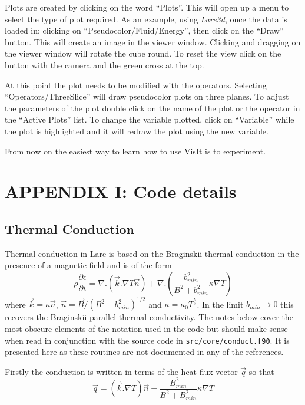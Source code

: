 \documentclass[11pt]{article}
\begin{document}
Plots are created by clicking on the word ``Plots''. This will open up a menu to select the type of plot required. As an example, using {\it Lare3d}, once the data is loaded in: clicking on ``Pseudocolor/Fluid/Energy'', then click on the ``Draw'' button. This will create an image in the viewer window. Clicking and dragging on the viewer window will rotate the cube round. To reset the view click on the button  with the camera and the green cross at the top. 

At this point the plot needs to be modified with the operators. Selecting ``Operators/ThreeSlice'' will draw pseudocolor plots on three planes. To adjust the parameters of the plot double click on the name of the plot or the operator in the ``Active Plots'' list. To change the variable plotted, click on ``Variable'' while the plot is highlighted and it will redraw the plot using the new variable.

From now on the easiest way to learn how to use VisIt is to experiment.

\newpage
\section*{ APPENDIX I: Code details}
\subsection*{Thermal Conduction} %
\label{sec:thermal_code}  

Thermal conduction in Lare is based on the Braginskii thermal conduction in the presence of a magnetic field and is of the form\\
\[
\rho \frac{\partial \epsilon}{\partial t} = \nabla . \left(\vec{k} . \nabla T \vec{n} \right) +  \nabla . \left(  \frac{b_{min}^2}{B^2+b_{min}^2} \kappa \nabla T \right)
\]
where $\vec{k} = \kappa \vec{n}$, $\vec{n} = \vec{B}/(B^2+b_{min}^2)^{1/2}$ and $\kappa = \kappa_0  T^\frac{5}{2}$. In the limit $b_{min}\to 0$ this recovers the Braginskii parallel thermal conductivity. The notes below cover the most obscure elements of the notation used in the code but should make sense when read in conjunction with the source code in {\tt src/core/conduct.f90}. It is presented here as these routines are not documented in any of the references. 

Firstly the conduction is written in terms of the heat flux vector $\vec{q}$ so that
\[
\vec{q}= \left(\vec{k} . \nabla T \right) \vec{n} +    \frac{B_{min}^2}{B^2+B_{min}^2} \kappa \nabla T
\]
\end{document}
